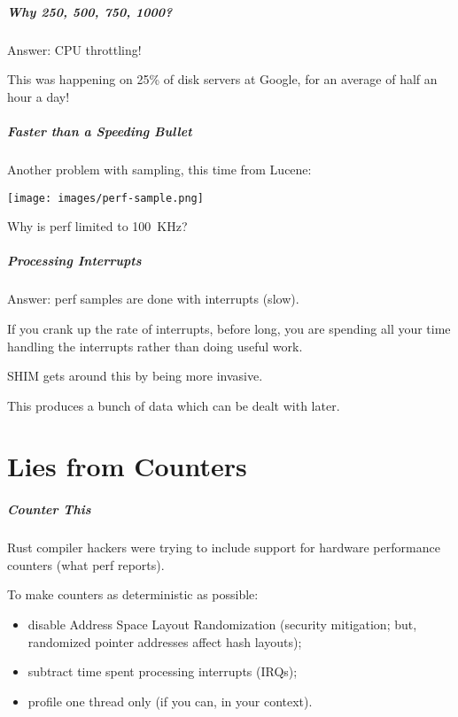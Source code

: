 \begin{frame}
\frametitle{Why 250, 500, 750, 1000?}

Answer: CPU throttling!

This was happening on 25\% of disk servers at Google, for an average of half an hour a day!

\end{frame}



\begin{frame}
\frametitle{Faster than a Speeding Bullet}

Another problem with sampling,
this time from Lucene:

\begin{center}
	\texttt{[image: images/perf-sample.png]}
\end{center}

Why is perf limited to 100~KHz?

\end{frame}



\begin{frame}
\frametitle{Processing Interrupts}

Answer: perf samples are done with interrupts (slow). 

If you crank up the rate of interrupts, before long, you are spending all your time handling the interrupts rather than doing useful work.

SHIM gets around this by being more invasive.

This produces a bunch of data which can be dealt with later.

\end{frame}

\part{Lies from Counters}

\begin{frame}
\partpage
\end{frame}


\begin{frame}
\frametitle{Counter This}

Rust compiler hackers were trying to include
support for hardware performance counters (what perf reports).

To make counters as deterministic as possible:
\begin{itemize}
\item disable Address Space Layout Randomization (security mitigation; but, randomized pointer addresses affect hash layouts);
\item subtract time spent processing interrupts (IRQs);
\item profile one thread only (if you can, in your context).
\end{itemize}


\end{frame}


